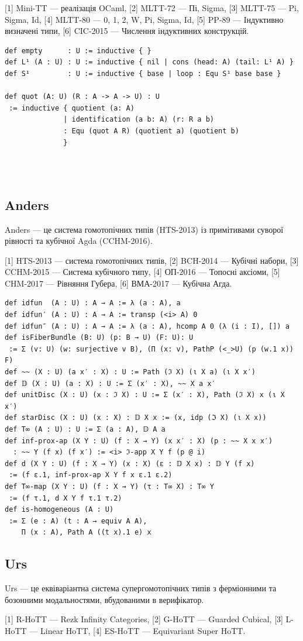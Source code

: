[1] Mini-TT — реалізація OCaml,
[2] MLTT-72 — Пі, Sigma,
[3] MLTT-75 — Pi, Sigma, Id,
[4] MLTT-80 — 0, 1, 2, W, Pi, Sigma, Id,
[5] PP-89 — Індуктивно визначені типи,
[6] CIC-2015 — Числення індуктивних конструкцій.

\begin{lstlisting}
def empty      : U := inductive { }
def L¹ (A : U) : U := inductive { nil | cons (head: A) (tail: L¹ A) }
def S¹         : U := inductive { base | loop : Equ S¹ base base }

def quot (A: U) (R : A -> A -> U) : U
 := inductive { quotient (a: A)
              | identification (a b: A) (r: R a b)
              : Equ (quot A R) (quotient a) (quotient b)
              }
\end{lstlisting}
\\
\\
\newpage
\subsection*{Anders}

Anders — це система гомотопічних типів (HTS-2013) із примітивами суворої рівності та кубічної Agda (CCHM-2016).

[1] HTS-2013 — система гомотопічних типів,
[2] BCH-2014 — Кубічні набори,
[3] CCHM-2015 — Система кубічного типу,
[4] ОП-2016 — Топосні аксіоми,
[5] CHM-2017 — Рівняння Губера,
[6] ВМА-2017 — Кубічна Агда.

\begin{lstlisting}
def idfun  (A : U) : A → A := λ (a : A), a
def idfun′ (A : U) : A → A := transp (<i> A) 0
def idfun″ (A : U) : A → A := λ (a : A), hcomp A 0 (λ (i : I), []) a
def isFiberBundle (B: U) (p: B → U) (F: U): U
 := Σ (v: U) (w: surjective v B), (Π (x: v), PathP (<_>U) (p (w.1 x)) F)
def ~~ (X : U) (a x′ : X) : U := Path (ℑ X) (ι X a) (ι X x′)
def 𝔻 (X : U) (a : X) : U := Σ (x′ : X), ~~ X a x′
def unitDisc (X : U) (x : ℑ X) : U := Σ (x′ : X), Path (ℑ X) x (ι X x′)
def starDisc (X : U) (x : X) : 𝔻 X x := (x, idp (ℑ X) (ι X x))
def T∞ (A : U) : U := Σ (a : A), 𝔻 A a
def inf-prox-ap (X Y : U) (f : X → Y) (x x′ : X) (p : ~~ X x x′)
  : ~~ Y (f x) (f x′) := <i> ℑ-app X Y f (p @ i)
def d (X Y : U) (f : X → Y) (x : X) (ε : 𝔻 X x) : 𝔻 Y (f x)
 := (f ε.1, inf-prox-ap X Y f x ε.1 ε.2)
def T∞-map (X Y : U) (f : X → Y) (τ : T∞ X) : T∞ Y
 := (f τ.1, d X Y f τ.1 τ.2)
def is-homogeneous (A : U)
 := Σ (e : A) (t : A → equiv A A),
    Π (x : A), Path A ((t x).1 e) x
\end{lstlisting}

\subsection*{Urs}

Urs — це еквіваріантна система супергомотопічних типів з ферміонними та бозонними модальностями,
вбудованими в верифікатор.

[1] R-HoTT — Rezk Infinity Categories,
[2] G-HoTT — Guarded Cubical,
[3] L-HoTT — Linear HoTT,
[4] ES-HoTT — Equivariant Super HoTT.

